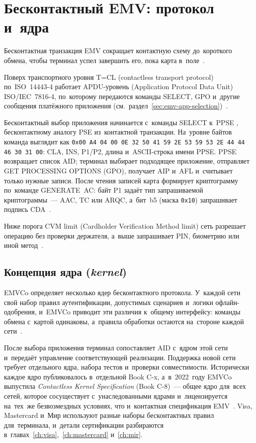\section{Бесконтактный EMV: протокол и~ядра}\label{sec:contactless-emv}

Бесконтактная транзакция EMV сокращает контактную схему до~короткого обмена,
чтобы терминал успел завершить его, пока карта
в~поле~\cite{emvco-contactless-book-a}.

Поверх транспортного уровня T=CL (contactless transport protocol)
по~ISO~14443-4 работает APDU-уровень (Application Protocol Data Unit)
ISO/IEC~7816-4, по~которому передаются команды SELECT, GPO и~другие сообщения
платёжного приложения
(см.~раздел~\ref{sec:emv-app-selection})~\cite{iso-7816-4}.

Бесконтактный выбор приложения начинается с~команды SELECT к~PPSE
, бесконтактному аналогу PSE из~контактной транзакции.
На~уровне байтов команда выглядит как \texttt{0x00 A4 04 00 0E 32 50 41 59 2E 53
59 53 2E 44 44 46 30 31 00}: CLA, INS, P1\slash P2, длина и~ASCII-строка имени
PPSE. PPSE возвращает список AID; терминал выбирает подходящее приложение,
отправляет GET PROCESSING OPTIONS (GPO), получает AIP и~AFL и~считывает только
нужные записи. После чтения записей карта формирует криптограмму по~команде
GENERATE~AC: байт P1 задаёт тип запрашиваемой криптограммы~--- AAC, TC или
ARQC, а~бит~b5 (маска \texttt{0x10}) запрашивает подпись
CDA~\cite{emvco-contactless-book-a}.

Ниже порога CVM limit (Cardholder Verification Method limit) сеть разрешает
операцию без проверки держателя, а~выше запрашивает PIN, биометрию или иной
метод~\cite{visa-tadg}.

\subsection*{Концепция ядра (\textit{kernel})}

EMVCo определяет несколько ядер бесконтактного протокола. У~каждой сети свой
набор правил аутентификации, допустимых сценариев и~логики офлайн-одобрения,
и~EMVCo приводит эти различия к~общему интерфейсу: команды обмена с~картой
одинаковы, а~правила обработки остаются на~стороне каждой
сети~\cite{emvco-contactless-book-a}.

После выбора приложения терминал сопоставляет AID с~ядром этой сети и~передаёт
управление соответствующей реализации. Поддержка новой сети требует отдельного
ядра, набора тестов и~проверки совместимости. Исторически каждое ядро
публиковалось в~отдельной Book C-x, а~в~2022~году EMVCo выпустила
\emph{Contactless Kernel Specification} (Book C-8)~--- общее ядро для~всех
сетей, которое сосуществует с~унаследованными ядрами и~лицензируется
на~тех~же безвозмездных условиях, что и~контактная спецификация
EMV~\cite{emvco-kernel-c8}. Visa, Mastercard и~Мир используют разные наборы
бесконтактных правил для~терминала, и~детали сертификации разбираются
в~главах~\ref{ch:visa},~\ref{ch:mastercard} и~\ref{ch:mir}.


